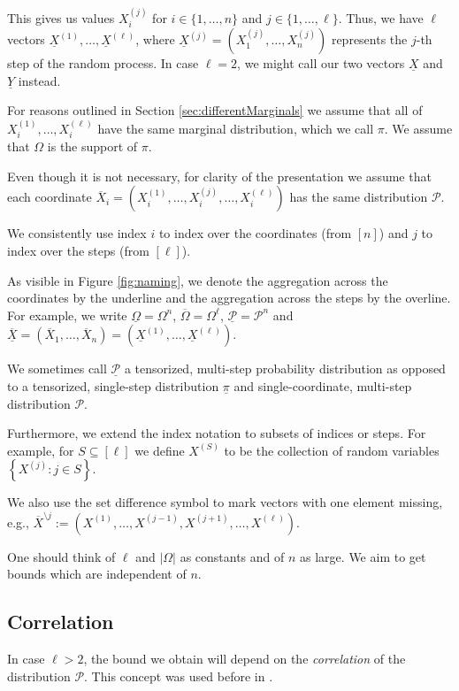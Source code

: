\documentclass{daj}
\newcommand{\1}{\mathbbm{1}}
\theoremstyle{plain}
\theoremstyle{definition}
\begin{document}
This gives us values $X_{i}^{(j)}$ for $i \in \{1,\ldots,n\}$ and 
$j \in \{1,\ldots,\ell\}$.
Thus, we have $\ell$ vectors
$\underline{X}^{(1)},\ldots,\underline{X}^{(\ell)}$,
where $\underline{X}^{(j)} = (X_1^{(j)},\ldots,X_n^{(j)})$
represents the $j$-th step of the random process. In case $\ell = 2$,
we might call our two vectors $\underline{X}$ and $\underline{Y}$ instead.

For reasons outlined in Section \ref{sec:differentMarginals} we assume that
all of $X_i^{(1)}, \ldots, X_i^{(\ell)}$ have the same marginal distribution,
which we call $\pi$. We assume that $\Omega$ is the support of $\pi$.

Even though it is not necessary,
for clarity of the presentation
we assume that each coordinate $\overline{X}_i = 
(X_i^{(1)},\ldots,X_i^{(j)},\ldots,X_i^{(\ell)})$ has the 
same distribution $\mathcal{P}$.

\medskip

We consistently use index $i$ to index over the coordinates 
(from $[n]$)
and $j$ to index over the steps (from $[\ell]$).

As visible in Figure \ref{fig:naming},
we denote the aggregation across the coordinates by the underline
and the aggregation across the steps by the overline.
For example, we write $\underline{\Omega} = \Omega^n$,
$\overline{\Omega} = \Omega^\ell$, 
$\underline{\mathcal{P}} = \mathcal{P}^n$
and $\overline{\underline{X}} = 
(\overline{X}_1, \ldots, \overline{X}_n)
\allowbreak = (\underline{X}^{(1)}, \ldots, \underline{X}^{(\ell)})$.

We sometimes call $\underline{\mathcal{P}}$ a tensorized, 
multi-step probability distribution
as opposed to a tensorized, single-step distribution 
$\underline{\mathcal{\pi}}$ and single-coordinate, multi-step distribution
$\mathcal{P}$.

Furthermore, we extend the index notation to subsets of indices or steps.
For example, for $S \subseteq [\ell]$ we define $X^{(S)}$ to be the
collection of random variables $\left\{ X^{(j)}: j \in S  \right\}$.

We also use the set difference symbol to mark vectors with one element missing,
e.g., $\overline{X}^{\setminus j} := (X^{(1)}, \ldots, X^{(j-1)}, X^{(j+1)}, \ldots,
X^{(\ell)})$.

\medskip

One should think of $\ell$ and $|\Omega|$ as constants and of $n$ as large.
We aim to get bounds which are independent of $n$.

\subsection{Correlation}
\label{sec:correlation}
In case $\ell > 2$, the bound we obtain will depend on the
\emph{correlation} of the distribution $\mathcal{P}$.
This concept was used before in \cite{Mos10}.
\end{document}
